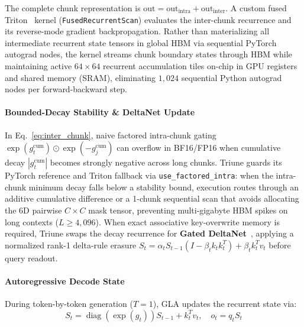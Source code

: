 \documentclass[10pt,twocolumn,letterpaper]{article}
\begin{document}
The complete chunk representation is $\text{out} = \text{out}_{\text{intra}} + \text{out}_{\text{inter}}$. A custom fused Triton~\cite{tillet2019triton} kernel (\texttt{FusedRecurrentScan}) evaluates the inter-chunk recurrence and its reverse-mode gradient backpropagation. Rather than materializing all intermediate recurrent state tensors in global HBM via sequential PyTorch autograd nodes, the kernel streams chunk boundary states through HBM while maintaining active $64 \times 64$ recurrent accumulation tiles on-chip in GPU registers and shared memory (SRAM), eliminating $1,024$ sequential Python autograd nodes per forward-backward step.

\paragraph{Bounded-Decay Stability \& DeltaNet Update} In Eq.~\eqref{eq:inter_chunk}, naive factored intra-chunk gating $\exp(g_t^{\text{cum}}) \odot \exp(-g_j^{\text{cum}})$ can overflow in BF16/FP16 when cumulative decay $|g_t^{\text{cum}}|$ becomes strongly negative across long chunks. Triune guards its PyTorch reference and Triton fallback via \texttt{use\_factored\_intra}: when the intra-chunk minimum decay falls below a stability bound, execution routes through an additive cumulative difference or a 1-chunk sequential scan that avoids allocating the 6D pairwise $C \times C$ mask tensor, preventing multi-gigabyte HBM spikes on long contexts ($L \ge 4,096$). When exact associative key-overwrite memory is required, Triune swaps the decay recurrence for \textbf{Gated DeltaNet}~\cite{yang2024gateddeltanet,schlag2021linear}, applying a normalized rank-1 delta-rule erasure $S_t = \alpha_t S_{t-1}(I - \beta_t k_t k_t^T) + \beta_t k_t^T v_t$ before query readout.

\paragraph{Autoregressive Decode State} During token-by-token generation ($T=1$), GLA updates the recurrent state via:
\begin{equation}
    S_t = \operatorname{diag}(\exp(g_t)) S_{t-1} + k_t^T v_t, \quad o_t = q_t S_t \label{eq:decode_step}
\end{equation}
\end{document}
